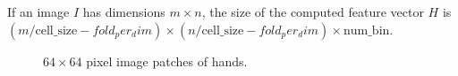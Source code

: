 If an image $I$ has dimensions $m\times n$, the size of the computed feature
vector $H$ is $(m/\text{cell\_size} - fold_per_dim) \times (n/\text{cell\_size}
- fold_per_dim) \times \text{num\_bin}$.

\begin{figure}[h]
  \centering
  \caption{$64\times64$ pixel image patches of hands.} \label{fig:hand}
\end{figure}




